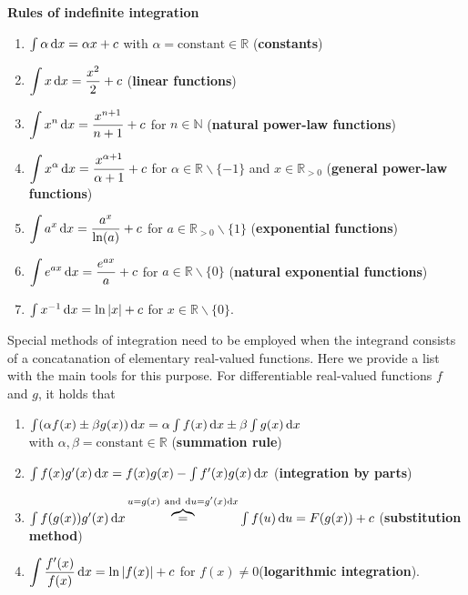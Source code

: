 \medskip
\noindent
{\bf Rules of indefinite integration}
%
\begin{enumerate}
\item $\int \alpha\,{\rm d}x = \alpha x + c$ with $\alpha
= \text{constant} \in \mathbb{R}$ \hfill ({\bf constants})
\item $\displaystyle \int x\,{\rm d}x = \frac{x^{2}}{2} + c$
 \hfill ({\bf linear functions})
\item $\displaystyle \int x^{n}\,{\rm d}x = \frac{x^{n+1}}{n+1} + 
c$ for $n \in \mathbb{N}$ \hfill ({\bf natural power-law 
functions})
\item $\displaystyle \int x^{\alpha}\,{\rm d}x = 
\frac{x^{\alpha+1}}{\alpha+1}
+ c$ for $\alpha \in \mathbb{R}\backslash\{-1\}$ and
$x \in \mathbb{R}_{> 0}$ \hfill ({\bf general power-law functions})
\item $\displaystyle \int a^{x}\,{\rm d}x = \frac{a^{x}}{\ln(a)} + c$ for $a \in \mathbb{R}_{> 0}\backslash\{1\}$
\hfill ({\bf exponential functions})
\item $\displaystyle \int e^{ax}\,{\rm d}x = \frac{e^{ax}}{a} + c$
for $a \in \mathbb{R}\backslash\{0\}$
\hfill ({\bf natural exponential functions})
\item $\int x^{-1}\,{\rm d}x = \ln|x| + c$ for $x \in \mathbb{R}\backslash\{0\}$.
\end{enumerate}
%
Special methods of integration need to be employed when the 
integrand consists of a concatanation of elementary real-valued 
functions. Here we provide a list with the main tools for this 
purpose. For differentiable real-valued functions $f$ and $g$, it 
holds that
%
\begin{enumerate}
\item $\int(\alpha f(x) \pm \beta g(x))\,{\rm d}x
= \alpha\int f(x)\,{\rm d}x \pm \beta\int g(x)\,{\rm d}x$ \\
with $\alpha,\beta = \text{constant} \in \mathbb{R}$
\hfill ({\bf summation rule})
\item $\int f(x)g^{\prime}(x)\,{\rm d}x = f(x)g(x)
- \int f^{\prime}(x)g(x)\,{\rm d}x$
\hfill ({\bf integration by parts})
\item $\int f(g(x))g^{\prime}(x)\,{\rm d}x
\overbrace{=}^{u=g(x)\ \text{and}\ {\rm d}u=g^{\prime}(x){\rm d}x}
\int f(u)\,{\rm d}u = F(g(x)) + c$
\hfill ({\bf substitution method})
\item $\displaystyle \int\frac{f^{\prime}(x)}{f(x)}\,{\rm d}x
= \ln|f(x)| + c$ for $f(x) \neq 0$\hfill ({\bf logarithmic integration}).
\end{enumerate}
%

